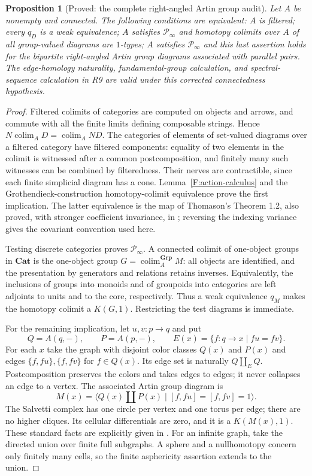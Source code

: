 \documentclass[11pt,a4paper]{article}
\newtheorem{proposition}[theorem]{Proposition}
\theoremstyle{definition}
\theoremstyle{remark}
\newcommand{\Cat}{\mathbf{Cat}}
\newcommand{\colim}{\operatorname*{colim}}
\begin{document}
\begin{proposition}[Proved: the complete right-angled Artin group audit]
\label{F:RAAG-audit}
Let $A$ be nonempty and connected.  The following conditions are
equivalent: $A$ is filtered; every $q_D$ is a weak equivalence;
$A$ satisfies $\mathcal P_\infty$ and homotopy colimits over $A$ of
all group-valued diagrams are $1$-types; $A$ satisfies
$\mathcal P_\infty$ and this last assertion holds for the bipartite
right-angled Artin group diagrams associated with parallel pairs.
The edge-homology naturality, fundamental-group calculation, and
spectral-sequence calculation in R9 are valid under this corrected
connectedness hypothesis.
\end{proposition}
\begin{proof}
Filtered colimits of categories are computed on objects and arrows,
and commute with all the finite limits defining composable strings.
Hence $N\colim_A D=\colim_A ND$.  The categories of elements of
set-valued diagrams over a filtered category have filtered components:
equality of two elements in the colimit is witnessed after a common
postcomposition, and finitely many such witnesses can be combined by
filteredness.  Their nerves are contractible, since each finite
simplicial diagram has a cone.  Lemma~\ref{F:action-calculus} and the
Grothendieck-construction homotopy-colimit equivalence prove the first
implication.  The latter equivalence is the map of Thomason's
Theorem 1.2, also proved, with stronger coefficient invariance, in
\citet[Theorem 1 and Section 3]{Cegarra2020}; reversing the indexing
variance gives the covariant convention used here.

Testing discrete categories proves $\mathcal P_\infty$.  A connected
colimit of one-object groups in $\Cat$ is the one-object group
$G=\colim_A^{\mathbf{Grp}}M$: all objects are identified, and the
presentation by generators and relations retains inverses.  Equivalently,
the inclusions of groups into monoids and of groupoids into categories
are left adjoints to units and to the core, respectively.  Thus a weak
equivalence $q_M$ makes the homotopy colimit a $K(G,1)$.  Restricting
the test diagrams is immediate.

For the remaining implication, let $u,v:p\to q$ and put
\[
 Q=A(q,-),\qquad P=A(p,-),\qquad
 E(x)=\{f:q\to x\mid fu=fv\}.
\]
For each $x$ take the graph with disjoint color classes $Q(x)$ and
$P(x)$ and edges $\{f,fu\},\{f,fv\}$ for $f\in Q(x)$.
Its edge set is naturally $Q\amalg_E Q$.  Postcomposition preserves
the colors and takes edges to edges; it never collapses an edge to a
vertex.  The associated Artin group diagram is
\[
 M(x)=\langle Q(x)\amalg P(x)\mid [f,fu]=[f,fv]=1\rangle.
\]
The Salvetti complex has one circle per vertex and one torus per edge;
there are no higher cliques.  Its cellular differentials are zero,
and it is a $K(M(x),1)$.  These standard facts are explicitly given in
\citet[Theorem 2.6 and Section 2.7]{Charney2007}.  For an infinite
graph, take the directed union over finite full subgraphs.  A sphere
and a nullhomotopy concern only finitely many cells, so the finite
asphericity assertion extends to the union.


\end{proof}
\end{document}

